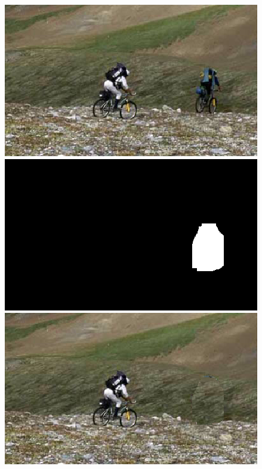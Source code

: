 \documentclass[a4paper, 10pt]{article}
\begin{document}
\begin{figure}[H]
\begin{minipage}{.4\textwidth}
\centering
\includegraphics[scale=0.25]{images/bike.png}
\end{minipage}%
\begin{minipage}{.4\textwidth}
\centering
\includegraphics[scale=0.25]{bike_mask17.png}
\end{minipage}%
\begin{minipage}{.4\textwidth}
\centering
\includegraphics[scale=0.25]{inpainted_bike17.png}
\end{minipage}%
\end{figure}
\end{document}
